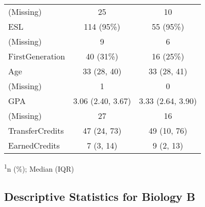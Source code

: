 \begin{appendix}
\begin{longtable}{lcc}
(Missing) & 25 & 10 \\ 
ESL & 114 (95\%) & 55 (95\%) \\ 
(Missing) & 9 & 6 \\ 
FirstGeneration & 40 (31\%) & 16 (25\%) \\ 
Age & 33 (28, 40) & 33 (28, 41) \\ 
(Missing) & 1 & 0 \\ 
GPA & 3.06 (2.40, 3.67) & 3.33 (2.64, 3.90) \\ 
(Missing) & 27 & 16 \\ 
TransferCredits & 47 (24, 73) & 49 (10, 76) \\ 
EarnedCredits & 7 (3, 14) & 9 (2, 13) \\ 
\bottomrule
\end{longtable}
\begin{minipage}{\linewidth}
\textsuperscript{1}n (\%); Median (IQR)\\
\end{minipage}

\clearpage

\hypertarget{descriptive-statistics-for-biology-b}{%
\subsection{Descriptive Statistics for Biology
B}\label{descriptive-statistics-for-biology-b}}


\end{appendix}
